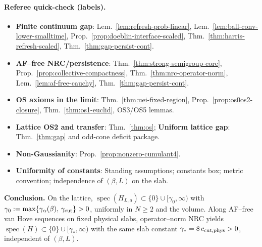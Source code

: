 \documentclass[11pt]{amsart}
\theoremstyle{plain}
\theoremstyle{definition}
\theoremstyle{remark}
\begin{document}
\begin{center}
{{\paragraph{Referee quick-check (labels).}
\begin{itemize}
  \item \textbf{Finite continuum gap}: Lem.~\ref{lem:refresh-prob-linear}, Lem.~\ref{lem:ball-conv-lower-smalltime}, Prop.~\ref{prop:doeblin-interface-scaled}, Thm.~\ref{thm:harris-refresh-scaled}, Thm.~\ref{thm:gap-persist-cont}.
  \item \textbf{AF–free NRC/persistence}: Thm.~\ref{thm:strong-semigroup-core}, Prop.~\ref{prop:collective-compactness}, Thm.~\ref{thm:nrc-operator-norm}, Lem.~\ref{lem:af-free-cauchy}, Thm.~\ref{thm:gap-persist-cont}.
  \item \textbf{OS axioms in the limit}: Thm.~\ref{thm:uei-fixed-region}, Prop.~\ref{prop:os0os2-closure}, Thm.~\ref{thm:os1-euclid}, OS3/OS5 lemmas.
  \item \textbf{Lattice OS2 and transfer}: Thm.~\ref{thm:os}; \textbf{Uniform lattice gap}: Thm.~\ref{thm:gap} and odd-cone deficit package.
  \item \textbf{Non-Gaussianity}: Prop.~\ref{prop:nonzero-cumulant4}.
  \item \textbf{Uniformity of constants}: Standing assumptions; constants box; metric convention; independence of $(\beta,L)$ on the slab.
\end{itemize}
\smallskip
\textbf{Conclusion.} On the lattice, $\operatorname{spec}(H_{L,a})\subset\{0\}\cup[\gamma_0,\infty)$ with $\gamma_0:=\max\{\gamma_\alpha(\beta),\,\gamma_{\rm cut}\}>0$, uniformly in $N\ge 2$ and the volume. Along AF--free van Hove sequences on fixed physical slabs, operator--norm NRC yields $\operatorname{spec}(H)\subset\{0\}\cup[\gamma_*,\infty)$ with the same slab constant $\gamma_* = 8\,c_{\rm cut,phys}>0$, independent of $(\beta,L)$.
}}
\end{center}
\end{document}
